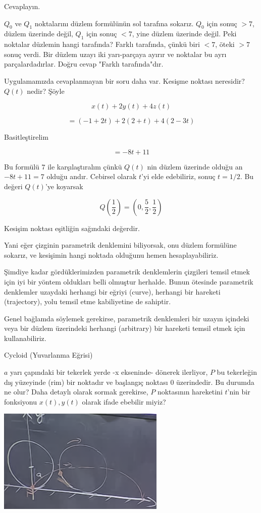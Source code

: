\documentclass[12pt,fleqn]{article}\usepackage{../../common}
\begin{document}
Cevaplayın. 

$Q_0$ ve $Q_1$ noktalarını düzlem formülünün sol tarafına sokarız. $Q_0$ için
sonuç $>7$, düzlem üzerinde değil, $Q_1$ için sonuç $<7$, yine düzlem üzerinde
değil. Peki noktalar düzlemin hangi tarafında? Farklı tarafında, çünkü biri
$<7$, öteki $>7$ sonuç verdi. Bir düzlem uzayı iki yarı-parçaya ayırır ve
noktalar bu ayrı parçalardadırlar. Doğru cevap "Farklı tarafında"dır.

Uygulamamızda cevaplanmayan bir soru daha var. Kesişme noktası neresidir?
$Q(t)$ nedir? Şöyle

$$ x(t) + 2y(t) + 4z(t) $$

$$ = (-1+2t) + 2(2+t) + 4(2-3t) $$

Basitleştirelim

$$ = -8t + 11 $$

Bu formülü $7$ ile karşılaştıralım çünkü $Q(t)$ nin düzlem üzerinde olduğu
an $-8t + 11 = 7$ olduğu andır. Cebirsel olarak $t$'yi elde edebiliriz,
sonuç $t=1/2$. Bu değeri $Q(t)$'ye koyarsak

$$ Q(\frac{1}{2}) = (0,\frac{5}{2},\frac{1}{2}) $$

Kesişim noktası eşitliğin sağındaki değerdir.

Yani eğer çizginin parametrik denklemini biliyorsak, onu düzlem formülüne
sokarız, ve kesişimin hangi noktada olduğunu hemen hesaplayabiliriz. 

Şimdiye kadar gördüklerimizden parametrik denklemlerin çizgileri temsil
etmek için iyi bir yöntem oldukları belli olmuştur herhalde. Bunun ötesinde
parametrik denklemler uzaydaki herhangi bir eğriyi (curve), herhangi bir
hareketi (trajectory), yolu temsil etme kabiliyetine de sahiptir. 

Genel bağlamda söylemek gerekirse, parametrik denklemleri bir uzayın içindeki 
veya bir
düzlem üzerindeki herhangi (arbitrary) bir hareketi temsil etmek için
kullanabiliriz.

Cycloid (Yuvarlanma Eğrisi)

$a$ yarı çapındaki bir tekerlek yerde -x ekseninde- dönerek ilerliyor, $P$ bu
tekerleğin dış yüzeyinde (rim) bir noktadır ve başlangıç noktası 0 üzerindedir.
Bu durumda ne olur? Daha detaylı olarak sormak gerekirse, $P$ noktasının
hareketini $t$'nin bir fonksiyonu $x(t),y(t)$ olarak ifade ebebilir miyiz?

\includegraphics[height=5cm]{5_3.png}
\end{document}
